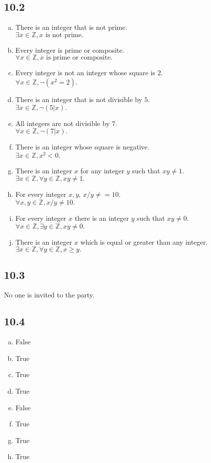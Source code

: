 \documentclass{article}
\begin{document}
\subsection*{10.2}
\begin{enumerate}[a.]
    \item There is an integer that is not prime.
    \\$\exists x \in \mathbb{Z}, x \textrm{ is not prime}.$
    \item Every integer is prime or composite.
    \\$\forall x \in \mathbb{Z}, x\textrm{ is prime or composite}.$
    \item Every integer is not an integer whose square is $2$.
    \\$\forall x \in \mathbb{Z}, \neg(x^2=2).$
    \item There is an integer that is not divisible by $5$.
    \\$\exists x \in \mathbb{Z}, \neg(5|x).$
    \item All integers are not divisible by $7$.
    \\$\forall x \in \mathbb{Z}, \neg(7|x).$
    \item There is an integer whose square is negative.
    \\$\exists x \in \mathbb{Z}, x^2 < 0.$
    \item There is an integer $x$ for any integer $y$ such that $xy\neq1$.
    \\$\exists x \in \mathbb{Z}, \forall y \in \mathbb{Z}, xy \neq 1.$
    \item For every integer $x,y$, $x/y\neq=10.$
    \\$\forall x,y \in \mathbb{Z}, x/y \neq 10.$
    \item For every integer $x$ there is an integer $y$ such that $xy\neq0$.
    \\$\forall x \in \mathbb{Z}, \exists y \in \mathbb{Z}, xy \neq 0.$
    \item There is an integer $x$ which is equal or greater than any integer.
    \\$\exists x \in \mathbb{Z}, \forall y \in \mathbb{Z}, x \geq y.$
\end{enumerate}

\subsection*{10.3}
No one is invited to the party.

\subsection*{10.4}
\begin{enumerate}[a.]
    \item False
    \item True
    \item True
    \item True
    \item False
    \item True
    \item True
    \item True
\end{enumerate}
\end{document}
